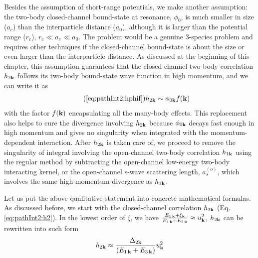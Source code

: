Besides the assumption of short-range potentials, we make another assumption:  the  two-body closed-channel bound-state at resonance, $\phi_{0}$, is much smaller in size ($a_{c}$) than the interparticle distance ($a_{0}$), although it is  larger than the potential range ($r_{c}$),    $r_{c}\ll{}a_{c}\ll{}a_{0}$.  The problem would be a genuine 3-species problem and requires other techniques if the closed-channel bound-state is about the size  or even larger than the interparticle distance. As discussed at the beginning of this chapter, this assumption guarantees that the closed-channel two-body correlation $h_{2\mathbf{k}}$ follows its two-body bound-state wave function in high momentum, and  we can write it as 
\begin{equation}\tag{\ref{eq:pathInt2:hphif}}
h_{2\vk}\sim\phi_{0\vk}f(\vk)
\end{equation}
with the factor $f(\mathbf{k})$ encapsulating all the many-body effects. This replacement also helps to  cure the divergence involving $h_{2\mathbf{k}}$ because $\phi_{0\mathbf{k}}$ decays fast enough in high momentum and gives no singularity when integrated with the momentum-dependent interaction.   After $h_{2\mathbf{k}}$ is taken care of, we proceed to remove the singularity of integral involving the open-channel two-body correlation $h_{1\mathbf{k}}$ using the regular method by subtracting the open-channel low-energy two-body interacting kernel, or the open-channel s-wave scattering length, $a_{s}^{(o)}$, which involves  the same high-momentum divergence as $h_{1\mathbf{k}}$. 



Let us put the above qualitative statement into concrete mathematical formulas.   As discussed before, we start with the closed-channel correlation $h_{2\mathbf{k}}$ (Eq. \ref{eq:pathInt2:h2}). In the lowest order of ${\zeta}$, we have $\frac{E_{1\,\mathbf{k}}+\xi_{\mathbf{k}}}{E_{1\,\mathbf{k}}+E_{2\,\mathbf{k}}}\approx{}u_{\mathbf{k}}^{2}$, $h_{2\mathbf{k}}$ can be rewritten into such form
\begin{equation}\label{eq:pathInt2:h2D2}
 h_{2\mathbf{k}}\approx\frac{\Delta_{2\mathbf{k}}}{(E_{1\,\mathbf{k}}+E_{3\,\mathbf{k}})}u_{\mathbf{k}}^{2}
\end{equation}

